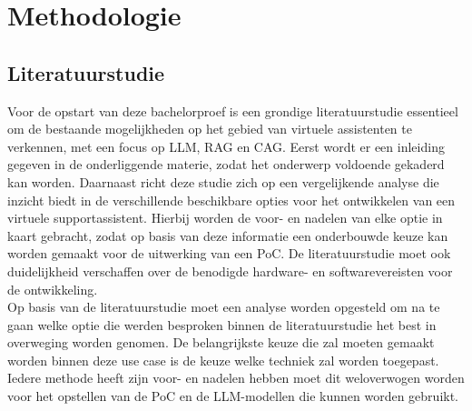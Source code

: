 
\chapter{Methodologie}
\label{ch:methodologie}



\section{Literatuurstudie}

Voor de opstart van deze bachelorproef is een grondige literatuurstudie essentieel om de bestaande mogelijkheden op het gebied van virtuele assistenten te verkennen, met een focus op LLM, RAG en CAG. Eerst wordt er een inleiding gegeven in de onderliggende materie, zodat het onderwerp voldoende gekaderd kan worden. Daarnaast richt deze studie zich op een vergelijkende analyse die inzicht biedt in de verschillende beschikbare opties voor het ontwikkelen van een virtuele supportassistent. Hierbij worden de voor- en nadelen van elke optie in kaart gebracht, zodat op basis van deze informatie een onderbouwde keuze kan worden gemaakt voor de uitwerking van een PoC. De literatuurstudie moet ook duidelijkheid verschaffen over de benodigde hardware- en softwarevereisten voor de ontwikkeling.
\\[1em]
Op basis van de literatuurstudie moet een analyse worden opgesteld om na te gaan welke optie die werden besproken binnen de literatuurstudie het best in overweging worden genomen. De belangrijkste keuze die zal moeten gemaakt worden binnen deze use case is de keuze welke techniek zal worden toegepast. Iedere methode heeft zijn voor- en nadelen hebben moet dit weloverwogen worden voor het opstellen van de PoC en de LLM-modellen die kunnen worden gebruikt.


